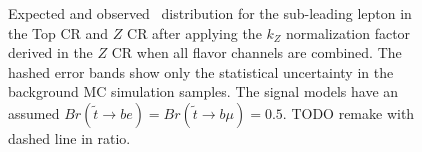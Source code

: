 \begin{figure}
  \centering
  \caption{Expected and observed \pt\ distribution for the sub-leading lepton in
    the Top CR and $Z$ CR after applying the $k_Z$ normalization factor derived
    in the $Z$ CR when all flavor channels are combined.
    The hashed error bands show only the statistical uncertainty in the
    background MC simulation samples.
    The signal models have an assumed
    $Br(\tilde{t}\rightarrow be) = Br(\tilde{t}\rightarrow b\mu) = 0.5$.
    {\color{red} TODO remake with dashed line in ratio.}
  }
  \label{fig:cr_lep_pt_1__w_norm_factor}
\end{figure}

